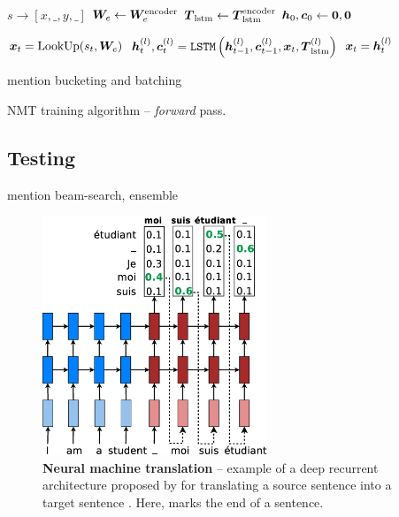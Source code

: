 \begin{algorithm}
$s \rightarrow [x, \text{\_}, y, \text{\_}]$ 
$\bm{W}_{e} \leftarrow \bm{W}_{e}^{\text{encoder}}$ 
$\mbox{\boldmath{$T$}}_{\text{lstm}} \leftarrow \mbox{\boldmath{$T$}}_{\text{lstm}}^{\text{encoder}}$  %
$\bm{h}_{0}, \bm{c}_{0} \leftarrow \bm{0}, \bm{0}$ 
{


$\bm{x}_{t} = \text{LookUp}(s_t, \bm{W}_{e})$ \;
 {
    $\bm{h}_{t}^{(l)}, \bm{c}_{t}^{(l)}= \text{\texttt{LSTM}}\left(\bm{h}_{t-1}^{(l)},
    \bm{c}_{t-1}^{(l)}, \bm{x}_{t}, \mbox{\boldmath{$T$}}_{\text{lstm}}^{(l)}\right)$ 
    $\bm{x}_{t} = \bm{h}_{t}^{(l)}$ \;
}

}


mention bucketing and batching




\caption{NMT training algorithm -- {\it forward} pass.}
\label{a:nmt_forward}
\end{algorithm}

\subsection{Testing}

mention beam-search, ensemble

\begin{figure}[tbh!]
\centering
\includegraphics[width=0.6\textwidth, clip=true, trim= 0 0 0
0]{img/nmt_test.eps} %
\caption[Neural machine translation]{{\bf Neural machine translation} -- example of a deep recurrent
architecture proposed by  for
translating a source sentence  into a target sentence
. Here, \word{\texttt{\_}} marks the end of a sentence.
} 
\label{f:nmt_test}
\end{figure}


